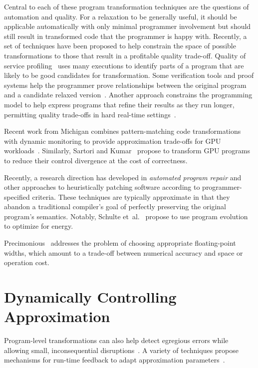 Central to each of these program transformation techniques are the questions
of automation and quality. For a relaxation to be generally useful, it should
be applicable automatically with only minimal programmer involvement but
should still result in transformed code that the programmer is happy with.
Recently, a set of techniques have been proposed to help constrain the space
of possible transformations to those that result in a profitable
quality trade-off. Quality of service profiling~\cite{qosprof} uses many
executions to identify parts of a program that are likely to be good
candidates for transformation. Some verification tools and proof systems help
the programmer prove relationships between the original program and a
candidate relaxed version~\cite{carbin-pldi, carbin-races, carbin-pepm,
rice-transformation-semantics}.
Another approach constrains the programming model to help express programs
that refine their results as they run longer, permitting quality trade-offs in
hard real-time settings~\cite{chung90}.

Recent work from Michigan combines pattern-matching code transformations with
dynamic monitoring to provide approximation trade-offs for GPU
workloads~\cite{paraprox, sage}.
Similarly, Sartori and Kumar~\cite{herding} propose to transform GPU programs
to reduce their control divergence at the cost of correctness.

Recently, a research direction has developed in \emph{automated program
repair} and other approaches to heuristically patching software according to
programmer-specified criteria.
These techniques are typically approximate in that they abandon a traditional
compiler's goal of perfectly preserving the original program's semantics.
Notably, Schulte et~al.~\cite{schulte} propose to use program evolution to
optimize for energy.

Precimonious~\cite{precimonious} addresses the problem of choosing appropriate
floating-point widths, which amount to a trade-off between numerical accuracy
and space or operation cost.


\section{Dynamically Controlling Approximation}

Program-level transformations can also help detect egregious errors while
allowing small, inconsequential disruptions~\cite{lwc, approxdebug}.
A variety of techniques propose mechanisms for run-time feedback to adapt
approximation parameters~\cite{dynamicknobs, green, approxit}.


